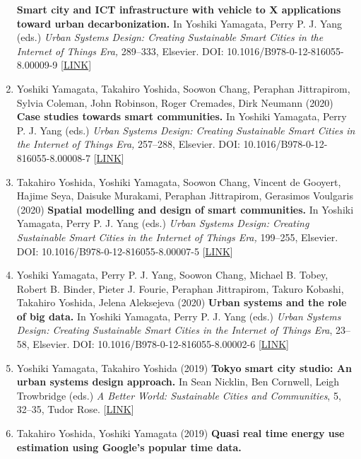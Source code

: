 \documentclass[
]{book}
\begin{document}
\begin{enumerate}
  \textbf{Smart city and ICT infrastructure with vehicle to X applications toward urban decarbonization.}
  In Yoshiki Yamagata, Perry P. J. Yang (eds.)
  \emph{Urban Systems Design: Creating Sustainable Smart Cities in the Internet of Things Era,} 289--333, Elsevier.
  DOI: 10.1016/B978-0-12-816055-8.00009-9 {[}\href{https://www.elsevier.com/books/urban-systems-design/yamagata/978-0-12-816055-8}{LINK}{]}
\item
  Yoshiki Yamagata, Takahiro Yoshida, Soowon Chang, Peraphan Jittrapirom, Sylvia Coleman, John Robinson, Roger Cremades, Dirk Neumann (2020)
  \textbf{Case studies towards smart communities.}
  In Yoshiki Yamagata, Perry P. J. Yang (eds.)
  \emph{Urban Systems Design: Creating Sustainable Smart Cities in the Internet of Things Era,} 257--288, Elsevier.
  DOI: 10.1016/B978-0-12-816055-8.00008-7 {[}\href{https://www.elsevier.com/books/urban-systems-design/yamagata/978-0-12-816055-8}{LINK}{]}
\item
  Takahiro Yoshida, Yoshiki Yamagata, Soowon Chang, Vincent de Gooyert, Hajime Seya, Daisuke Murakami, Peraphan Jittrapirom, Gerasimos Voulgaris (2020)
  \textbf{Spatial modelling and design of smart communities.}
  In Yoshiki Yamagata, Perry P. J. Yang (eds.)
  \emph{Urban Systems Design: Creating Sustainable Smart Cities in the Internet of Things Era,} 199--255, Elsevier.
  DOI: 10.1016/B978-0-12-816055-8.00007-5 {[}\href{https://www.elsevier.com/books/urban-systems-design/yamagata/978-0-12-816055-8}{LINK}{]}
\item
  Yoshiki Yamagata, Perry P. J. Yang, Soowon Chang, Michael B. Tobey, Robert B. Binder, Pieter J. Fourie, Peraphan Jittrapirom, Takuro Kobashi, Takahiro Yoshida, Jelena Aleksejeva (2020)
  \textbf{Urban systems and the role of big data.}
  In Yoshiki Yamagata, Perry P. J. Yang (eds.)
  \emph{Urban Systems Design: Creating Sustainable Smart Cities in the Internet of Things Era}, 23--58, Elsevier.
  DOI: 10.1016/B978-0-12-816055-8.00002-6 {[}\href{https://www.elsevier.com/books/urban-systems-design/yamagata/978-0-12-816055-8}{LINK}{]}
\item
  Yoshiki Yamagata, Takahiro Yoshida (2019)
  \textbf{Tokyo smart city studio: An urban systems design approach.}
  In Sean Nicklin, Ben Cornwell, Leigh Trowbridge (eds.)
  \emph{A Better World: Sustainable Cities and Communities}, 5, 32--35, Tudor Rose.
  {[}\href{http://unhabitat.org.mm/publications/a-better-world-volume-5/}{LINK}{]}
\item
  Takahiro Yoshida, Yoshiki Yamagata (2019)
  \textbf{Quasi real time energy use estimation using Google's popular time data.}

\end{enumerate}
\end{document}
